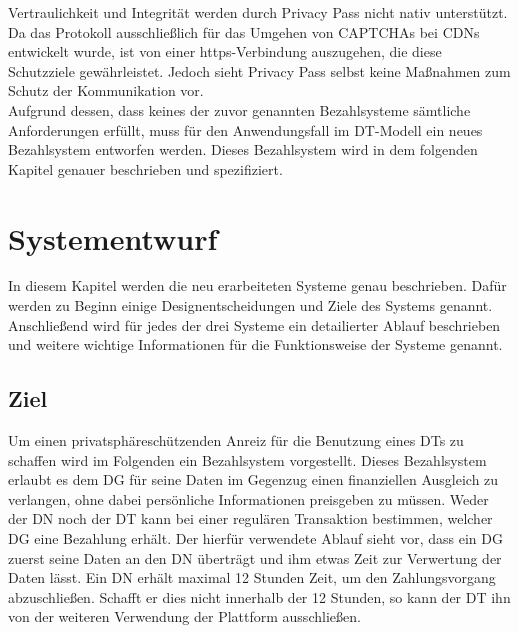 \documentclass[
	fontsize=11pt,
	headings=small,
	parskip=half,           %
	bibliography=totoc,
	numbers=noenddot,       %
	open=any,               %
]{scrreprt}
\begin{document}
Vertraulichkeit und Integrität werden durch Privacy Pass nicht nativ unterstützt. Da das Protokoll ausschließlich für das Umgehen von CAPTCHAs bei CDNs entwickelt wurde, ist von einer https-Verbindung auszugehen, die diese Schutzziele gewährleistet. Jedoch sieht Privacy Pass selbst keine Maßnahmen zum Schutz der Kommunikation vor.\\

Aufgrund dessen, dass keines der zuvor genannten Bezahlsysteme sämtliche Anforderungen erfüllt, muss für den Anwendungsfall im DT-Modell ein neues Bezahlsystem entworfen werden. Dieses Bezahlsystem wird in dem folgenden Kapitel genauer beschrieben und spezifiziert. 






\chapter{Systementwurf}
\label{chap:systems}

In diesem Kapitel werden die neu erarbeiteten Systeme genau beschrieben. Dafür werden zu Beginn einige Designentscheidungen und Ziele des Systems genannt. Anschließend wird für jedes der drei Systeme ein detailierter Ablauf beschrieben und weitere wichtige Informationen für die Funktionsweise der Systeme genannt.

\section{Ziel}
\label{sec:mainPart_ziel}
Um einen privatsphäreschützenden Anreiz für die Benutzung eines DTs zu schaffen wird im Folgenden ein Bezahlsystem vorgestellt. Dieses Bezahlsystem erlaubt es dem DG für seine Daten im Gegenzug einen finanziellen Ausgleich zu verlangen, ohne dabei persönliche Informationen preisgeben zu müssen. Weder der DN noch der DT kann bei einer regulären Transaktion bestimmen, welcher DG eine Bezahlung erhält. Der hierfür verwendete Ablauf sieht vor, dass ein DG zuerst seine Daten an den DN überträgt und ihm etwas Zeit zur Verwertung der Daten lässt. Ein DN erhält maximal 12 Stunden Zeit, um den Zahlungsvorgang abzuschließen. Schafft er dies nicht innerhalb der 12 Stunden, so kann der DT ihn von der weiteren Verwendung der Plattform ausschließen. 
\end{document}
